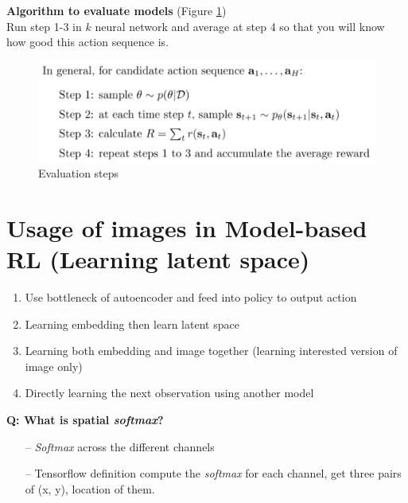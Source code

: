 \documentclass{article}
\begin{document}
\textbf{Algorithm to evaluate models} (Figure \ref{fig:al2})\\
Run step 1-3 in $k$ neural network and average at step 4 so that you will know how good this action sequence is.
\begin{figure}[tbh]
    \centering
        \includegraphics[width=0.7\linewidth]{img/al2.png}
    \caption{Evaluation steps}
    \label{fig:al2}
\end{figure}

\section{Usage of images in Model-based RL (Learning latent space)}
\begin{enumerate}
   \item Use bottleneck of autoencoder and feed into policy to output action
   \item Learning embedding then learn latent space
   \item Learning both embedding and image together (learning interested version of image only)
   \item Directly learning the next observation using another model
\end{enumerate}

\textbf{Q: What is spatial \textit{softmax}?}
\begin{itemize}
\item[--] \textit{Softmax} across the different channels
\item[--] Tensorflow definition compute the \textit{softmax} for each channel, get three pairs of (x, y), location of them.
\end{itemize}

\small


\end{document}
